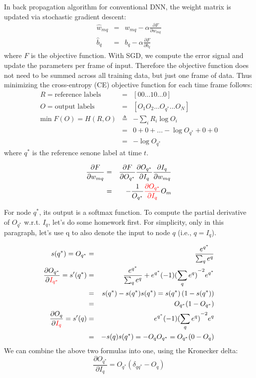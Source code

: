\documentclass[9pt]{article}
\begin{document}
\begin{itemize}
In back propagation algorithm for conventional DNN, the weight 
matrix is updated via stochastic gradient descent:
\begin{eqnarray*}
\hat{w}_{mq} & = & w_{mq} - \alpha \frac{\partial F}{\partial w_{mq}} \\
\hat{b}_{q} & = & b_q - \alpha \frac{\partial F}{\partial b_q}
\end{eqnarray*}
where $F$ is the objective function. 
With SGD, we compute the error signal and update the parameters per frame of
input. Therefore the objective function does not need to be summed across
all training data, but just one frame of data. Thus
minimizing the cross-entropy (CE) objective function for each time frame follows:
\begin{eqnarray*}
R =  \mbox{reference labels} & = & \left[0 0 ... 1 0 ... 0 \right] \\
O = \mbox{output labels} & = & \left[ O_1 O_2 ... O_{q^*} ... O_N \right] \\
\mbox{min}\;F(O) = H(R,O) & \triangleq & -\sum_i R_i \log {O_i} \\
& = & 0 + 0 + ... - \log O_{q^*} + 0 + 0 \\
& = & - \log O_{q^*} 
\end{eqnarray*}
where $q^*$ is the reference senone label at time $t$.

\begin{eqnarray*}
\frac{\partial F}{\partial w_{mq}} & = & \frac{\partial F}{\partial O_{q^*}} 
\frac{\partial O_{q^*}}{\partial I_q} \frac{\partial I_q}{\partial w_{mq}} \\
 & = & - \frac{1}{O_{q^*}} {\color{red} \frac{\partial O_{q^*}}{\partial I_q}} O_m \\
\end{eqnarray*}

For node $q^*$, its output is a softmax function. To compute the partial
derivative of $O_{q^*}$  w.r.t. $I_q$, let's do some homework first.
For simplicity, only in this paragraph, let's use q to also denote the input 
to node $q$ (i.e., $q=I_q$).

\begin{eqnarray*}
s(q^*) = O_{q^*} & = & \frac{e^{q^*}}{\sum_q e^q} \\
\frac{\partial O_{q^*}}{\partial \color{red}I_{q^*}} = s'(q^*) & = & \frac{e^{q^*}}{\sum_q e^q} + e^{q^*}(-1){({\sum_q e^q})}^{-2} e^{q^*} \\
 & = & s(q^*) - s(q^*)s(q^*) = s(q^*) \left( 1-s(q^*) \right) \\
 & = & O_{q^*} (1-O_{q^*}) \\
\frac{\partial O_q}{\partial \color{red}I_q} = s'(q)  & = &  e^{q^*}(-1){({\sum_q e^q})}^{-2} e^q \\
  & = & -s(q)s(q^*) = -O_q O_{q^*} = O_{q^*} ( 0 - O_q) \\
\end{eqnarray*}
We can combine the above two formulas into one, using the Kronecker delta:
\[ \frac{\partial O_{q^*}}{\partial I_q} = O_{q^*} (\delta_{qq^*} - O_q) \]


\end{itemize}
\end{document}
